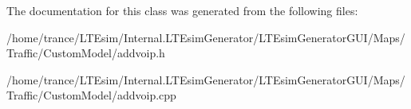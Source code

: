 The documentation for this class was generated from the following files\+:\begin{DoxyCompactItemize}
\item 
/home/trance/\+L\+T\+Esim/\+Internal.\+L\+T\+Esim\+Generator/\+L\+T\+Esim\+Generator\+G\+U\+I/\+Maps/\+Traffic/\+Custom\+Model/addvoip.\+h\item 
/home/trance/\+L\+T\+Esim/\+Internal.\+L\+T\+Esim\+Generator/\+L\+T\+Esim\+Generator\+G\+U\+I/\+Maps/\+Traffic/\+Custom\+Model/addvoip.\+cpp\end{DoxyCompactItemize}
